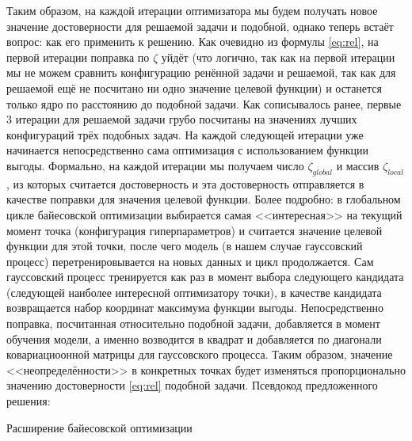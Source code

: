 \documentclass[times,specification,annotation]{itmo-student-thesis}
\begin{document}
	Таким образом, на каждой итерации оптимизатора мы будем получать новое значение достоверности для решаемой задачи и подобной, однако теперь встаёт вопрос: как его применить к решению. Как очевидно из формулы \ref{eq:rel}, на первой итерации поправка по $ \zeta$ уйдёт (что логично, так как на первой итерации мы не можем сравнить конфигурацию ренённой задачи и решаемой, так как для решаемой ещё не посчитано ни одно значение целевой функции) и останется только ядро по расстоянию до подобной задачи. Как сописывалось ранее, первые 3 итерации для решаемой задачи грубо посчитаны на значениях лучших конфигураций трёх подобных задач. На каждой следующей итерации уже начинается непосредственно сама оптимизация с использованием функции выгоды. Формально, на каждой итерации мы получаем число $ \zeta_{global} $ и массив $ \zeta_{local} $, из которых считается достоверность и эта достоверность отправляется в качестве поправки для значения целевой функции. Более подробно: в глобальном цикле байесовской оптимизации выбирается самая <<интересная>> на текущий момент точка (конфигурация гиперпараметров) и считается значение целевой функции для этой точки, после чего модель (в нашем случае гауссовский процесс) перетренировывается на новых данных и цикл продолжается. Сам гауссовский процесс тренируется как раз в момент выбора следующего кандидата (следующей наиболее интересной оптимизатору точки), в качестве кандидата возвращается набор координат максимума функции выгоды. Непосредственно поправка, посчитанная относительно подобной задачи, добавляется в момент обучения модели, а именно возводится в квадрат и добавляется по диагонали ковариациоонной матрицы для гауссовского процесса. Таким образом, значение <<неопределённости>> в конкретных точках будет изменяться пропорционально значению достоверности \ref{eq:rel} подобной задачи. Псевдокод предложенного решения:
	
	\begin{algorithm}[!ht]
		\caption{Расширение байесовской оптимизации}\label{alg:pbo}
		\begin{algorithmic}
			\EndFor
		\end{algorithmic}
	\end{algorithm}
	
\end{document}
